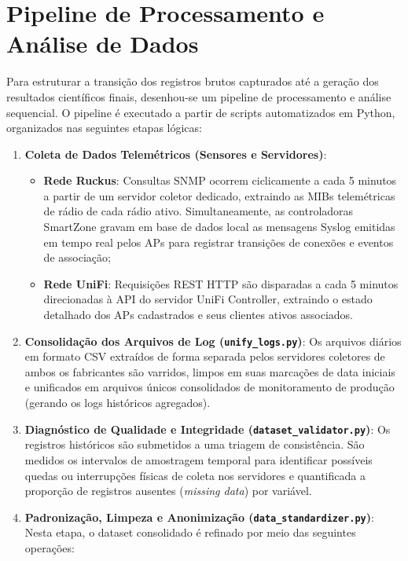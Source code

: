 \section{Pipeline de Processamento e Análise de Dados}
\label{sec:metodologia_pipeline}

Para estruturar a transição dos registros brutos capturados até a geração dos resultados científicos finais, desenhou-se um pipeline de processamento e análise sequencial. O pipeline é executado a partir de scripts automatizados em Python, organizados nas seguintes etapas lógicas:

\begin{enumerate}
    \item \textbf{Coleta de Dados Telemétricos (Sensores e Servidores)}:
    \begin{itemize}
        \item \textbf{Rede Ruckus}: Consultas SNMP ocorrem ciclicamente a cada 5 minutos a partir de um servidor coletor dedicado, extraindo as MIBs telemétricas de rádio de cada rádio ativo. Simultaneamente, as controladoras SmartZone gravam em base de dados local as mensagens Syslog emitidas em tempo real pelos APs para registrar transições de conexões e eventos de associação;
        \item \textbf{Rede UniFi}: Requisições REST HTTP são disparadas a cada 5 minutos direcionadas à API do servidor UniFi Controller, extraindo o estado detalhado dos APs cadastrados e seus clientes ativos associados.
    \end{itemize}
    \item \textbf{Consolidação dos Arquivos de Log (\texttt{unify\_logs.py})}:
    Os arquivos diários em formato CSV extraídos de forma separada pelos servidores coletores de ambos os fabricantes são varridos, limpos em suas marcações de data iniciais e unificados em arquivos únicos consolidados de monitoramento de produção (gerando os logs históricos agregados).
    \item \textbf{Diagnóstico de Qualidade e Integridade (\texttt{dataset\_validator.py})}:
    Os registros históricos são submetidos a uma triagem de consistência. São medidos os intervalos de amostragem temporal para identificar possíveis quedas ou interrupções físicas de coleta nos servidores e quantificada a proporção de registros ausentes (\textit{missing data}) por variável.
    \item \textbf{Padronização, Limpeza e Anonimização (\texttt{data\_standardizer.py})}:
    Nesta etapa, o dataset consolidado é refinado por meio das seguintes operações:

\end{enumerate}
